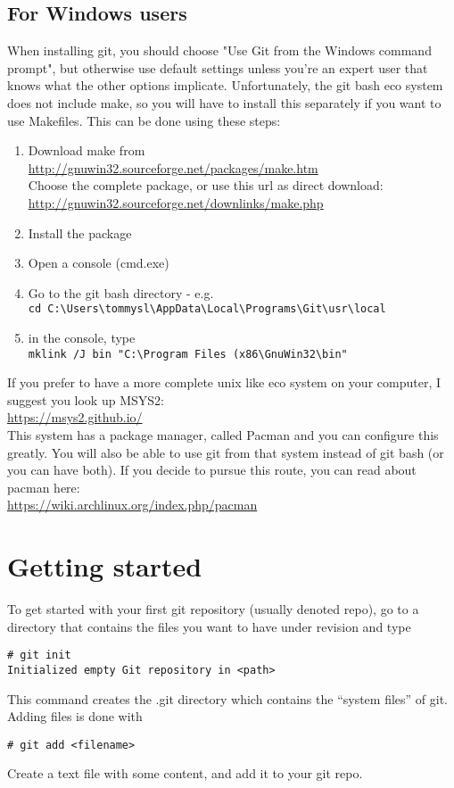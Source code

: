 \documentclass[10pt,a4paper]{article}
\begin{document}
\subsection{For Windows users}
When installing git, you should choose "Use Git from the Windows command prompt", but otherwise use default settings unless you're an expert user that knows what the other options implicate. Unfortunately, the git bash eco system does not include make, so you will have to install this separately if you want to use Makefiles. This can be done using these steps:
\begin{enumerate}
\item Download make from\\\url{http://gnuwin32.sourceforge.net/packages/make.htm}\\Choose the complete package, or use this url as direct download:\\ \url{http://gnuwin32.sourceforge.net/downlinks/make.php}
\item Install the package
\item Open a console (cmd.exe)
\item Go to the git bash directory - e.g.\\\texttt{cd C:\textbackslash{}Users\textbackslash{}tommysl\textbackslash{}AppData\textbackslash{}Local\textbackslash{}Programs\textbackslash{}Git\textbackslash{}usr\textbackslash{}local}
\item in the console, type\\
\texttt{mklink /J bin "C:\textbackslash{}Program Files (x86\textbackslash{}GnuWin32\textbackslash{}bin"}
\end{enumerate}
If you prefer to have a more complete unix like eco system on your computer, I suggest you look up MSYS2:\\
\url{https://msys2.github.io/}\\
This system has a package manager, called Pacman and you can configure this greatly. You will also be able to use git from that system instead of git bash (or you can have both). If you decide to pursue this route, you can read about pacman here:\\
\url{https://wiki.archlinux.org/index.php/pacman}

\section{Getting started}
To get started with your first git repository (usually denoted repo), go to a directory that contains the files you want to have under revision and type
\begin{lstlisting}
# git init
Initialized empty Git repository in <path>
\end{lstlisting}
This command creates the .git directory which contains the ``system files'' of git.
Adding files is done with
\begin{lstlisting}
# git add <filename>
\end{lstlisting}
Create a text file with some content, and add it to your git repo.
\end{document}

